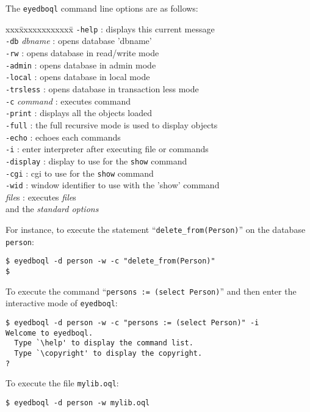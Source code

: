 The \texttt{eyedboql} command line options are as follows:
\begin{tabbing}
xxx\=xxxxxxxxxxxx\=\kill
\> \texttt{-help}       \> : displays this current message\\
\> \texttt{-db} \emph{dbname}\> : opens database 'dbname'\\
\> \texttt{-rw}         \> : opens database in read/write mode\\
\> \texttt{-admin}      \> : opens database in admin mode\\
\> \texttt{-local}      \> : opens database in local mode\\
\> \texttt{-trsless}    \> : opens database in transaction less mode\\
\> \texttt{-c} \emph{command}\> : executes command\\
\> \texttt{-print}      \> : displays all the objects loaded\\
\> \texttt{-full}       \> : the full recursive mode is used to display objects\\
\> \texttt{-echo}       \> : echoes each commands\\
\> \texttt{-i}          \> : enter interpreter after executing file or commands\\
\> \texttt{-display}    \> : display to use for the \texttt{show} command\\
\> \texttt{-cgi}        \> : cgi to use for the \texttt{show} command\\
\> \texttt{-wid}        \> : window identifier to use with the 'show' command\\
\> \emph{file}s      \> : executes \emph{file}s\\
\> and the \emph{\eyedb standard options}\\
\end{tabbing}
For instance, to execute the statement ``\texttt{delete\_from(Person)}''
on the database \texttt{person}:
\begin{verbatim}
$ eyedboql -d person -w -c "delete_from(Person)"
$
\end{verbatim}
To execute the command ``\texttt{persons := (select Person)}'' and then
enter the interactive mode of \texttt{eyedboql}:
\begin{verbatim}
$ eyedboql -d person -w -c "persons := (select Person)" -i
Welcome to eyedboql.
  Type `\help' to display the command list.
  Type `\copyright' to display the copyright.
?
\end{verbatim}
To execute the file \texttt{mylib.oql}:
\begin{verbatim}
$ eyedboql -d person -w mylib.oql
\end{verbatim}


